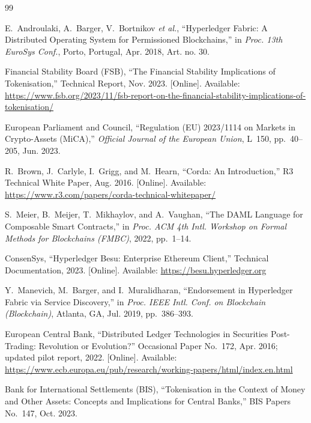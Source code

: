 \documentclass[journal,10pt,twocolumn]{IEEEtran}
\begin{document}
\begin{thebibliography}{99}

E.~Androulaki, A.~Barger, V.~Bortnikov \textit{et al.}, ``Hyperledger Fabric: A Distributed Operating System for Permissioned Blockchains,'' in \emph{Proc. 13th EuroSys Conf.}, Porto, Portugal, Apr. 2018, Art. no. 30.

Financial Stability Board (FSB), ``The Financial Stability Implications of Tokenisation,'' Technical Report, Nov. 2023. [Online]. Available: \url{https://www.fsb.org/2023/11/fsb-report-on-the-financial-stability-implications-of-tokenisation/}

European Parliament and Council, ``Regulation (EU) 2023/1114 on Markets in Crypto-Assets (MiCA),'' \emph{Official Journal of the European Union}, L~150, pp.~40--205, Jun. 2023.

R.~Brown, J.~Carlyle, I.~Grigg, and M.~Hearn, ``Corda: An Introduction,'' R3 Technical White Paper, Aug. 2016. [Online]. Available: \url{https://www.r3.com/papers/corda-technical-whitepaper/}

S.~Meier, B.~Meijer, T.~Mikhaylov, and A.~Vaughan, ``The DAML Language for Composable Smart Contracts,'' in \emph{Proc. ACM 4th Intl. Workshop on Formal Methods for Blockchains (FMBC)}, 2022, pp.~1--14.

ConsenSys, ``Hyperledger Besu: Enterprise Ethereum Client,'' Technical Documentation, 2023. [Online]. Available: \url{https://besu.hyperledger.org}

Y.~Manevich, M.~Barger, and I.~Muralidharan, ``Endorsement in Hyperledger Fabric via Service Discovery,'' in \emph{Proc. IEEE Intl. Conf. on Blockchain (Blockchain)}, Atlanta, GA, Jul. 2019, pp.~386--393.

European Central Bank, ``Distributed Ledger Technologies in Securities Post-Trading: Revolution or Evolution?'' Occasional Paper No.~172, Apr. 2016; updated pilot report, 2022. [Online]. Available: \url{https://www.ecb.europa.eu/pub/research/working-papers/html/index.en.html}

Bank for International Settlements (BIS), ``Tokenisation in the Context of Money and Other Assets: Concepts and Implications for Central Banks,'' BIS Papers No.~147, Oct. 2023.


\end{thebibliography}
\end{document}
